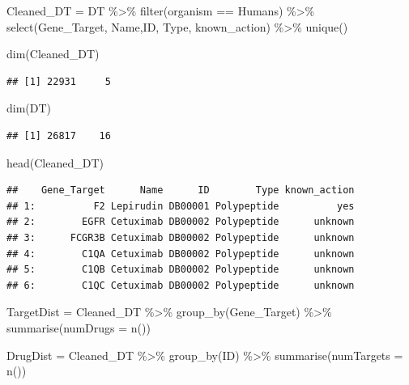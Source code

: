 \documentclass[
]{book}
\newenvironment{Shaded}{\begin{snugshade}}{\end{snugshade}}
\newcommand{\AttributeTok}[1]{\textcolor[rgb]{0.77,0.63,0.00}{#1}}
\newcommand{\FunctionTok}[1]{\textcolor[rgb]{0.00,0.00,0.00}{#1}}
\newcommand{\NormalTok}[1]{#1}
\newcommand{\OtherTok}[1]{\textcolor[rgb]{0.56,0.35,0.01}{#1}}
\newcommand{\SpecialCharTok}[1]{\textcolor[rgb]{0.00,0.00,0.00}{#1}}
\newcommand{\StringTok}[1]{\textcolor[rgb]{0.31,0.60,0.02}{#1}}
\begin{document}
\begin{Shaded}
\begin{Highlighting}[]
\NormalTok{Cleaned\_DT }\OtherTok{=}\NormalTok{ DT }\SpecialCharTok{\%\textgreater{}\%} 
  \FunctionTok{filter}\NormalTok{(organism }\SpecialCharTok{==} \StringTok{\textquotesingle{}Humans\textquotesingle{}}\NormalTok{) }\SpecialCharTok{\%\textgreater{}\%}
  \FunctionTok{select}\NormalTok{(Gene\_Target, Name,ID, Type, known\_action) }\SpecialCharTok{\%\textgreater{}\%}
  \FunctionTok{unique}\NormalTok{() }

\FunctionTok{dim}\NormalTok{(Cleaned\_DT)}
\end{Highlighting}
\end{Shaded}

\begin{verbatim}
## [1] 22931     5
\end{verbatim}

\begin{Shaded}
\begin{Highlighting}[]
\FunctionTok{dim}\NormalTok{(DT)}
\end{Highlighting}
\end{Shaded}

\begin{verbatim}
## [1] 26817    16
\end{verbatim}

\begin{Shaded}
\begin{Highlighting}[]
\FunctionTok{head}\NormalTok{(Cleaned\_DT)}
\end{Highlighting}
\end{Shaded}

\begin{verbatim}
##    Gene_Target      Name      ID        Type known_action
## 1:          F2 Lepirudin DB00001 Polypeptide          yes
## 2:        EGFR Cetuximab DB00002 Polypeptide      unknown
## 3:      FCGR3B Cetuximab DB00002 Polypeptide      unknown
## 4:        C1QA Cetuximab DB00002 Polypeptide      unknown
## 5:        C1QB Cetuximab DB00002 Polypeptide      unknown
## 6:        C1QC Cetuximab DB00002 Polypeptide      unknown
\end{verbatim}

\begin{Shaded}
\begin{Highlighting}[]
\NormalTok{TargetDist }\OtherTok{=}\NormalTok{ Cleaned\_DT }\SpecialCharTok{\%\textgreater{}\%} 
  \FunctionTok{group\_by}\NormalTok{(Gene\_Target) }\SpecialCharTok{\%\textgreater{}\%}
  \FunctionTok{summarise}\NormalTok{(}\AttributeTok{numDrugs =} \FunctionTok{n}\NormalTok{()) }

\NormalTok{DrugDist }\OtherTok{=}\NormalTok{ Cleaned\_DT }\SpecialCharTok{\%\textgreater{}\%} 
  \FunctionTok{group\_by}\NormalTok{(ID) }\SpecialCharTok{\%\textgreater{}\%}
  \FunctionTok{summarise}\NormalTok{(}\AttributeTok{numTargets =} \FunctionTok{n}\NormalTok{()) }
\end{Highlighting}
\end{Shaded}
\end{document}
